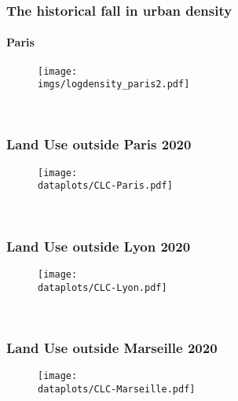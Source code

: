 \documentclass[aspectratio=169]{beamer}
\begin{document}
\begin{frame}[label=Paris]
\frametitle{The historical fall in urban density}
\framesubtitle{Paris}
\begin{figure}
	\begin{center}
		\texttt{[image: \\imgs/logdensity\_paris2.pdf]}
	\end{center}
\end{figure}
\hspace{-1cm}
\hyperlink{density}{}\\
\end{frame}

\begin{frame}[label=LandUseMeasureParis]
	\frametitle{Land Use outside Paris 2020}
	\begin{figure}
		\begin{center}
			\texttt{[image: \\dataplots/CLC-Paris.pdf]}
		\end{center}
	\end{figure}
	\hspace{-1cm}
	\hyperlink{CLCmeasure}{}\\
\end{frame}

\begin{frame}[label=LandUseMeasureLyon]
	\frametitle{Land Use outside Lyon 2020}
	\begin{figure}
		\begin{center}
			\texttt{[image: \\dataplots/CLC-Lyon.pdf]}
		\end{center}
	\end{figure}
	\hspace{-1cm}
	\hyperlink{CLCmeasure}{}\\
\end{frame}

\begin{frame}[label=LandUseMeasureMarseille]
	\frametitle{Land Use outside Marseille 2020}
	\begin{figure}
		\begin{center}
			\texttt{[image: \\dataplots/CLC-Marseille.pdf]}
		\end{center}
	\end{figure}
	\hspace{-1cm}
	\hyperlink{CLCmeasure}{}\\
\end{frame}
\end{document}
